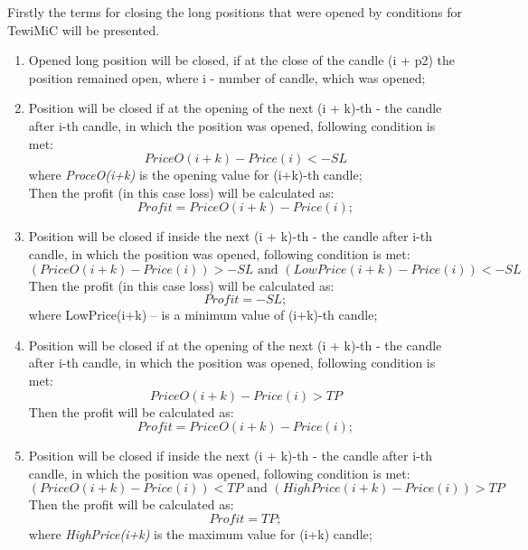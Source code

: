 \documentclass{tewiart}
\begin{document}
\noindent Firstly the terms for closing the long positions that were opened by conditions for TewiMiC will be presented.
\begin{enumerate}
\item Opened long position will be closed, if at the close of the candle (i + p2) the position remained open, where i - number of candle, which was opened;

\item Position will be closed if at the opening of the next (i + k)-th - the candle after i-th candle, in which the position was opened, following condition is met: 
\begin{equation}
PriceO(i+k)-Price(i) <-SL
\end{equation} 
where \textit{ProceO(i+k)} is the opening value for (i+k)-th candle;\\
Then the profit (in this case loss) will be calculated as:
\begin{equation}
Profit =PriceO (i+k)-Price(i);
\end{equation}

\item Position will be closed if inside the next (i + k)-th - the candle after i-th candle, in which the position was opened, following condition is met: 
\begin{equation}
(PriceO(i+k)-Price(i) )>-SL \text{ and } (LowPrice(i+k)-Price(i))<-SL
\end{equation} 
Then the profit (in this case loss) will be calculated as:
\begin{equation}
Profit =-SL;
\end{equation}
where LowPrice(i+k) – is a minimum value of (i+k)-th candle;

\item Position will be closed if at the opening of the next (i + k)-th - the candle after i-th candle, in which the position was opened, following condition is met: 
\begin{equation}
PriceO(i+k)-Price(i)>TP
\end{equation} 
Then the profit will be calculated as:
\begin{equation}
Profit =PriceO (i+k)-Price(i);
\end{equation}

\item Position will be closed if inside the next (i + k)-th - the candle after i-th candle, in which the position was opened, following condition is met: 
\begin{equation}
(PriceO(i+k)-Price(i) )<TP \text{ and } (HighPrice(i+k)-Price(i))>TP
\end{equation} 
Then the profit will be calculated as:
\begin{equation}
Profit =TP;
\end{equation}
where \textit{HighPrice(i+k)} is the maximum value for (i+k) candle;


\end{enumerate}
\end{document}
